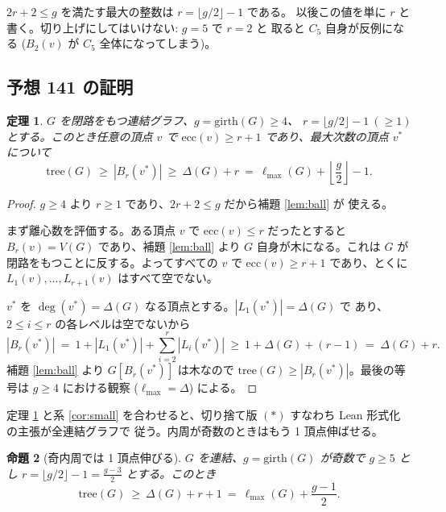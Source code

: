 \documentclass[paper=a4,fontsize=10.5pt,jafontsize=10.5pt]{jlreq}
\theoremstyle{plain}
\newtheorem{theorem}{定理}[section]
\newtheorem{proposition}[theorem]{命題}
\theoremstyle{definition}
\begin{document}
$2r + 2 \le g$ を満たす最大の整数は $r = \lfloor g/2 \rfloor - 1$ である。
以後この値を単に $r$ と書く。切り上げにしてはいけない: $g = 5$ で $r = 2$ と
取ると $C_5$ 自身が反例になる ($B_2(v)$ が $C_5$ 全体になってしまう)。

\subsection{予想 141 の証明}

\begin{theorem}\label{thm:main}
$G$ を閉路をもつ連結グラフ、$g = \mathrm{girth}(G) \ge 4$、
$r = \lfloor g/2 \rfloor - 1 \ (\ge 1)$ とする。このとき任意の頂点 $v$ で
$\mathrm{ecc}(v) \ge r + 1$ であり、最大次数の頂点 $v^*$ について
\[ \mathrm{tree}(G) \ \ge \ |B_r(v^*)| \ \ge \ \Delta(G) + r
   \ = \ \ell_{\max}(G) + \left\lfloor \frac{g}{2} \right\rfloor - 1 . \]
\end{theorem}

\begin{proof}
$g \ge 4$ より $r \ge 1$ であり、$2r + 2 \le g$ だから補題 \ref{lem:ball} が
使える。

まず離心数を評価する。ある頂点 $v$ で $\mathrm{ecc}(v) \le r$ だったとすると
$B_r(v) = V(G)$ であり、補題 \ref{lem:ball} より $G$ 自身が木になる。これは
$G$ が閉路をもつことに反する。よってすべての $v$ で $\mathrm{ecc}(v) \ge r+1$
であり、とくに $L_1(v), \dots, L_{r+1}(v)$ はすべて空でない。

$v^*$ を $\deg(v^*) = \Delta(G)$ なる頂点とする。$|L_1(v^*)| = \Delta(G)$ で
あり、$2 \le i \le r$ の各レベルは空でないから
\[ |B_r(v^*)| \ = \ 1 + |L_1(v^*)| + \sum_{i=2}^{r} |L_i(v^*)|
   \ \ge \ 1 + \Delta(G) + (r-1) \ = \ \Delta(G) + r . \]
補題 \ref{lem:ball} より $G[B_r(v^*)]$ は木なので
$\mathrm{tree}(G) \ge |B_r(v^*)|$。最後の等号は $g \ge 4$ における観察
($\ell_{\max} = \Delta$) による。
\end{proof}

定理 \ref{thm:main} と系 \ref{cor:small} を合わせると、切り捨て版
$(\ast)$ すなわち Lean 形式化 \cite{formalconj} の主張が全連結グラフで
従う。内周が奇数のときはもう 1 頂点伸ばせる。

\begin{proposition}[奇内周では 1 頂点伸びる]\label{prop:odd}
$G$ を連結、$g = \mathrm{girth}(G)$ が奇数で $g \ge 5$ とし
$r = \lfloor g/2 \rfloor - 1 = \tfrac{g-3}{2}$ とする。このとき
\[ \mathrm{tree}(G) \ \ge \ \Delta(G) + r + 1
   \ = \ \ell_{\max}(G) + \frac{g-1}{2} . \]
\end{proposition}
\end{document}
